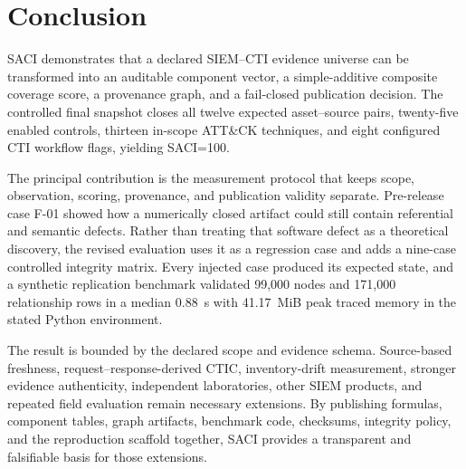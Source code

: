 \documentclass[a4paper,conference]{IEEEtran}
\begin{document}
\section{Conclusion}
SACI demonstrates that a declared SIEM--CTI evidence universe can be transformed into an auditable component vector, a simple-additive composite coverage score, a provenance graph, and a fail-closed publication decision. The controlled final snapshot closes all twelve expected asset--source pairs, twenty-five enabled controls, thirteen in-scope ATT\&CK techniques, and eight configured CTI workflow flags, yielding SACI=100.

The principal contribution is the measurement protocol that keeps scope, observation, scoring, provenance, and publication validity separate. Pre-release case F-01 showed how a numerically closed artifact could still contain referential and semantic defects. Rather than treating that software defect as a theoretical discovery, the revised evaluation uses it as a regression case and adds a nine-case controlled integrity matrix. Every injected case produced its expected state, and a synthetic replication benchmark validated 99,000 nodes and 171,000 relationship rows in a median 0.88~s with 41.17~MiB peak traced memory in the stated Python environment.

The result is bounded by the declared scope and evidence schema. Source-based freshness, request--response-derived CTIC, inventory-drift measurement, stronger evidence authenticity, independent laboratories, other SIEM products, and repeated field evaluation remain necessary extensions. By publishing formulas, component tables, graph artifacts, benchmark code, checksums, integrity policy, and the reproduction scaffold together, SACI provides a transparent and falsifiable basis for those extensions.

\newpage
{}


\end{document}
